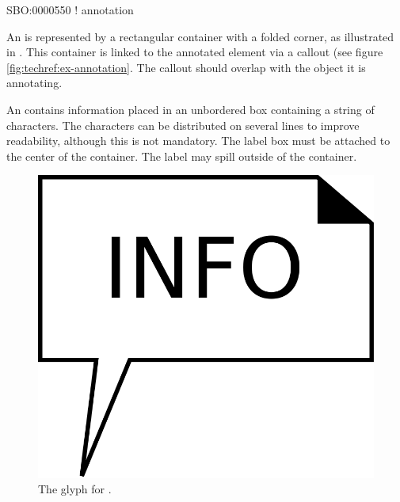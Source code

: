 \begin{glyphDescription}

\glyphSboTerm SBO:0000550 ! annotation

\glyphContainer An  is represented by a rectangular
container with a folded corner, as illustrated in
. This container is linked to the annotated element
via a callout (see figure \ref{fig:techref:ex-annotation}. The callout should
overlap with the object it is annotating.

\glyphLabel An  contains information placed in an unbordered box containing a string of characters.  The characters can be distributed on several lines to improve readability, although this is not mandatory.  The label box must be attached to the center of the container. The label may spill outside of the container.

\end{glyphDescription}

\begin{figure}[htb]
  \centering
  \includegraphics[scale = 0.3]{images/annotation}
  \caption{The \PD glyph for .}
  \label{fig:techref:annotation}
\end{figure}

